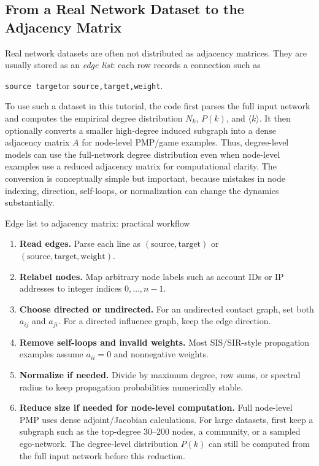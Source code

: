\documentclass[11pt,a4paper]{article}
\begin{document}
\subsection{From a Real Network Dataset to the Adjacency Matrix}
\label{subsec:real-network-to-adj}

Real network datasets are often not distributed as adjacency matrices. They are usually stored as an \emph{edge list}: each row records a connection such as
\begin{center}
\texttt{source target}\qquad or \qquad \texttt{source,target,weight}.
\end{center}
To use such a dataset in this tutorial, the code first parses the full input network and computes the empirical degree distribution $N_k$, $P(k)$, and $\langle k\rangle$. It then optionally converts a smaller high-degree induced subgraph into a dense adjacency matrix $A$ for node-level PMP/game examples. Thus, degree-level models can use the full-network degree distribution even when node-level examples use a reduced adjacency matrix for computational clarity. The conversion is conceptually simple but important, because mistakes in node indexing, direction, self-loops, or normalization can change the dynamics substantially.

\begin{examplebox}{Edge list to adjacency matrix: practical workflow}
\begin{enumerate}
  \item \textbf{Read edges.} Parse each line as $(\text{source},\text{target})$ or $(\text{source},\text{target},\text{weight})$.
  \item \textbf{Relabel nodes.} Map arbitrary node labels such as account IDs or IP addresses to integer indices $0,\dots,n-1$.
  \item \textbf{Choose directed or undirected.} For an undirected contact graph, set both $a_{ij}$ and $a_{ji}$. For a directed influence graph, keep the edge direction.
  \item \textbf{Remove self-loops and invalid weights.} Most SIS/SIR-style propagation examples assume $a_{ii}=0$ and nonnegative weights.
  \item \textbf{Normalize if needed.} Divide by maximum degree, row sums, or spectral radius to keep propagation probabilities numerically stable.
  \item \textbf{Reduce size if needed for node-level computation.} Full node-level PMP uses dense adjoint/Jacobian calculations. For large datasets, first keep a subgraph such as the top-degree 30--200 nodes, a community, or a sampled ego-network. The degree-level distribution $P(k)$ can still be computed from the full input network before this reduction.
\end{enumerate}
\end{examplebox}
\end{document}
